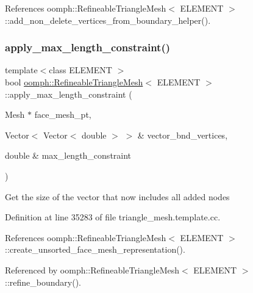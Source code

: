 References oomph\+::\+Refineable\+Triangle\+Mesh$<$ E\+L\+E\+M\+E\+N\+T $>$\+::add\+\_\+non\+\_\+delete\+\_\+vertices\+\_\+from\+\_\+boundary\+\_\+helper().

\mbox{\label{classoomph_1_1RefineableTriangleMesh_abcfd90d11b4bc87de160736c0542d65c}} 
\subsubsection{\texorpdfstring{apply\+\_\+max\+\_\+length\+\_\+constraint()}{apply\_max\_length\_constraint()}}
{\footnotesize\ttfamily template$<$class E\+L\+E\+M\+E\+NT $>$ \\
bool \hyperlink{classoomph_1_1RefineableTriangleMesh}{oomph\+::\+Refineable\+Triangle\+Mesh}$<$ E\+L\+E\+M\+E\+NT $>$\+::apply\+\_\+max\+\_\+length\+\_\+constraint (\begin{DoxyParamCaption}\item[{Mesh $\ast$}]{face\+\_\+mesh\+\_\+pt,  }\item[{Vector$<$ Vector$<$ double $>$ $>$ \&}]{vector\+\_\+bnd\+\_\+vertices,  }\item[{double \&}]{max\+\_\+length\+\_\+constraint }\end{DoxyParamCaption})\hspace{0.3cm}{\ttfamily [protected]}}

Get the size of the vector that now includes all added nodes 

Definition at line 35283 of file triangle\+\_\+mesh.\+template.\+cc.



References oomph\+::\+Refineable\+Triangle\+Mesh$<$ E\+L\+E\+M\+E\+N\+T $>$\+::create\+\_\+unsorted\+\_\+face\+\_\+mesh\+\_\+representation().



Referenced by oomph\+::\+Refineable\+Triangle\+Mesh$<$ E\+L\+E\+M\+E\+N\+T $>$\+::refine\+\_\+boundary().

\mbox{\label{classoomph_1_1RefineableTriangleMesh_a44ebcc99018e3d6795eca66ea20628b0}} 
